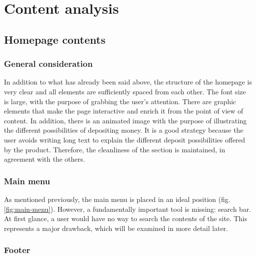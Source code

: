 \section{Content analysis}

\subsection{Homepage contents}

\subsubsection{General consideration}

In addition to what has already been said above, the structure of the 
homepage is very clear and all elements are sufficiently spaced from each 
other. The font size is large, with the purpose of grabbing the user's 
attention. There are graphic elements that make the page interactive and 
enrich it from the point of view of content. In addition, there is an 
animated image with the purpose of illustrating the different possibilities 
of depositing money. It is a good strategy because the user avoids writing 
long text to explain the different deposit possibilities offered by the 
product. Therefore, the cleanliness of the section is maintained, in 
agreement with the others.

\subsubsection{Main menu}

As mentioned previously, the main menu is placed in an ideal position 
(fig. \ref{fig:main-menu}). However, a fundamentally important tool is 
missing: search bar. At first glance, a user would have no way to search 
the contents of the site. This represents a major drawback, which will 
be examined in more detail later.

\subsubsection{Footer}

